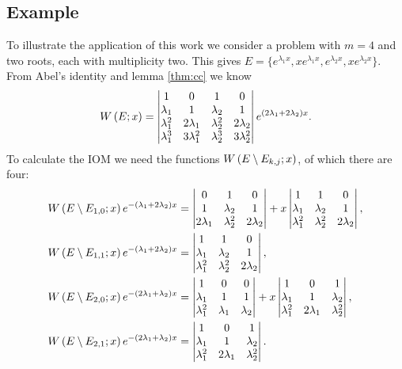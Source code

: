 \documentclass{article}
\begin{document}
\subsection{Example}

To illustrate the application of this work we consider a problem with $m=4$ and two roots, each with multiplicity two.
This gives $E = \{e^{\lambda_1 x}, x e^{\lambda_1 x}, e^{\lambda_2 x}, x e^{\lambda_2 x} \}$.
From Abel's identity and lemma \ref{thm:cc} we know
\begin{equation*}
W \left ( E ; x \right ) = \begin{vmatrix} 1 & 0 & 1 & 0 \\ \lambda_1 & 1 & \lambda_2 & 1 \\
\lambda_1^2 & 2 \lambda_1 & \lambda_2^2 & 2 \lambda_2 \\
\lambda_1^3 & 3 \lambda_1^2 & \lambda_2^3 & 3 \lambda^2_2 \end{vmatrix} e^{ (2 \lambda_1 + 2 \lambda_2 ) x } .
\end{equation*}
To calculate the IOM we need the functions $W \left ( E \setminus E_{k,j} ; x \right )$, of which there are four:
\begin{align*}
W \left ( E \setminus E_{1,0} ; x \right ) e^{ -( \lambda_1 + 2 \lambda_2 ) x } & = \begin{vmatrix} 0 & 1 & 0 \\ 1 & \lambda_2 & 1 \\ 2 \lambda_1 & \lambda_2^2 & 2 \lambda_2 \end{vmatrix} + x \begin{vmatrix} 1 & 1 & 0 \\ \lambda_1 & \lambda_2 & 1 \\ \lambda_1^2 & \lambda_2^2 & 2 \lambda_2 \end{vmatrix}, \\
W \left ( E \setminus E_{1,1} ; x \right ) e^{ -( \lambda_1 + 2 \lambda_2 ) x } & = \begin{vmatrix} 1 & 1 & 0 \\ \lambda_1 & \lambda_2 & 1 \\ \lambda_1^2 & \lambda_2^2 & 2 \lambda_2 \end{vmatrix}, \\
W \left ( E \setminus E_{2,0} ; x \right ) e^{ -(2 \lambda_1 + \lambda_2 ) x } & = \begin{vmatrix} 1 & 0 & 0 \\ \lambda_1 & 1 & 1 \\ \lambda_1^2 & \lambda_1 & \lambda_2 \end{vmatrix} + x \begin{vmatrix} 1 & 0 & 1 \\ \lambda_1 & 1 & \lambda_2 \\ \lambda_1^2 & 2 \lambda_1 & \lambda_2^2 \end{vmatrix}, \\
W \left ( E \setminus E_{2,1} ; x \right ) e^{ -(2 \lambda_1 + \lambda_2 ) x } & = \begin{vmatrix} 1 & 0 & 1 \\ \lambda_1 & 1 & \lambda_2 \\ \lambda_1^2 & 2 \lambda_1 & \lambda_2^2 \end{vmatrix} .
\end{align*}
\end{document}
